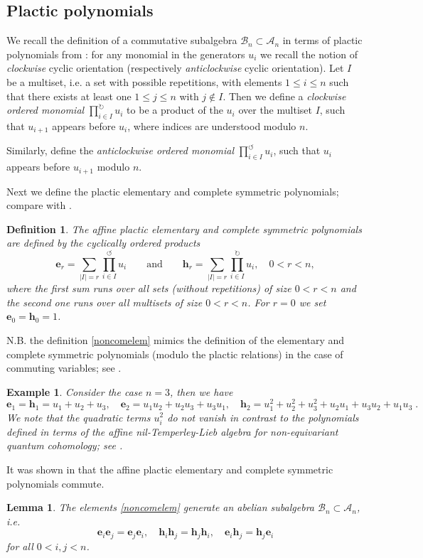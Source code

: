 \documentclass[12pt]{amsart}
\newcommand{\mc}[1]{\mathcal{#1}}
\newcommand{\bs}[1]{\boldsymbol{#1}}
\newtheorem{defn}{Definition}[section]
\newtheorem{lemma}[prop]{Lemma}
\newtheorem{example}[prop]{Example}
\numberwithin{equation}{section}
\numberwithin{figure}{section}
\begin{document}
    \subsection{Plactic polynomials}
    We recall the definition of a commutative subalgebra $\mc{B}_n\subset\mc{A}_n$ in terms of plactic polynomials from \cite{korffstroppel2010}: for any monomial in the generators $u_i$ we recall the notion of {\em clockwise} cyclic orientation (respectively {\em anticlockwise} cyclic orientation). Let $I$ be a multiset, i.e. a set with possible repetitions, with elements $1\le i\le n$ such that there exists at least one $1\le j\le n$ with $j\not\in I$. Then we define a {\em clockwise ordered monomial} $\prod\limits_{i \in I}^{\circlearrowright} u_i$ to be a product of the $u_i$ over the multiset $I$, such that $u_{i + 1}$ appears before $u_i$, where indices are understood modulo $n$. 
    
    Similarly, define the {\em anticlockwise ordered monomial} $\prod\limits_{i \in I}^{\circlearrowleft} u_i$, such that $u_i$ appears before $u_{i + 1}$ modulo $n$.
    
    Next we define the plactic elementary and complete symmetric polynomials; compare with \cite{korffstroppel2010}.
    \begin{defn}
        The affine plactic elementary and complete symmetric polynomials are defined by the cyclically ordered products
        \begin{equation}\label{noncomelem}
            \bs{e}_r = \sum\limits_{|I| = r}\prod\limits_{i \in I}^{\circlearrowleft} u_i \qquad\text{and}\qquad 
            \bs{h}_r = \sum\limits_{|I| = r} \prod\limits_{i \in I}^{\circlearrowright} u_i, \quad 0<r< n,
        \end{equation}
        where the first sum runs over all sets (without repetitions) of size $0< r<n$ and the second one runs over all multisets of size $0<r<n$. For $r=0$ we set $\bs{e}_0=\bs{h}_0=1$.
    \end{defn}
    N.B. the definition \eqref{noncomelem} mimics the definition of the elementary and complete symmetric polynomials (modulo the plactic relations) in the case of commuting variables; see \cite{macdonald1998symmetric}.  
    \begin{example}\rm
        Consider the case $n = 3$, then we have
        \[
        \bs{e}_1 = \bs{h}_1 = u_1 + u_2 + u_3, \quad \bs{e}_2 = u_1 u_2 + u_2 u_3 + u_3 u_1, \quad \bs{h}_2 = u_1^2 + u_2^2 + u_3^2 + u_2 u_1 + u_3 u_2 + u_1 u_3\;.
        \]
        We note that the quadratic terms $u_i^2$ do not vanish in contrast to the polynomials defined in terms of the affine nil-Temperley-Lieb algebra for non-equivariant quantum cohomology; see \cite{Post05}.
    \end{example}
    It was shown in \cite{korffstroppel2010} that the affine plactic elementary and complete symmetric polynomials commute.
    \begin{lemma}
    The elements \eqref{noncomelem} generate an abelian subalgebra $\mc{B}_n\subset\mc{A}_n$, i.e.
    \[
    \bs{e}_i\bs{e}_j =\bs{e}_j\bs{e}_i,\quad\bs{h}_i\bs{h}_j=\bs{h}_j\bs{h}_i,\quad
    \bs{e}_i\bs{h}_j=\bs{h}_j\bs{e}_i
    \]
        for all $0<i,j<n$.
    \end{lemma}
\end{document}
